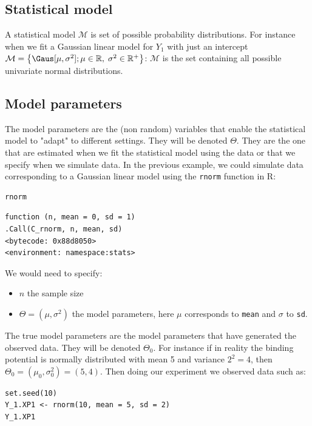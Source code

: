 \documentclass[12pt]{article}
\newcommand\Real{\mathbb{R}}
\newcommand\model{\mathcal{M}}
\begin{document}
\subsection{Statistical model}
\label{sec:org286bccc}
A statistical model \(\model\) is set of possible probability
distributions. For instance when we fit a Gaussian linear model for
\(Y_1\) with just an intercept \(\model=\left\{\Gaus[\mu,\sigma^2];\mu
\in \Real, \; \sigma^2 \in \Real^+ \right\}\): \(\model\) is the set
containing all possible univariate normal distributions.

\subsection{Model parameters}
\label{sec:org93a7194}

The model parameters are the (non random) variables that enable the
statistical model to "adapt" to different settings. They will be
denoted \(\Theta\). They are the one that are estimated when we fit
the statistical model using the data or that we specify when we
simulate data. In the previous example, we could simulate data
corresponding to a Gaussian linear model using the \texttt{rnorm} function in
R:
\lstset{language=r,label= ,caption= ,captionpos=b,numbers=none}
\begin{lstlisting}
rnorm
\end{lstlisting}

\begin{verbatim}
function (n, mean = 0, sd = 1) 
.Call(C_rnorm, n, mean, sd)
<bytecode: 0x88d8050>
<environment: namespace:stats>
\end{verbatim}

We would need to specify:
\begin{itemize}
\item \(n\) the sample size
\item \(\Theta=(\mu,\sigma^2)\) the model parameters, here \(\mu\) corresponds to \texttt{mean} and \(\sigma\) to \texttt{sd}.
\end{itemize}

\bigskip

The true model parameters are the model parameters that have generated
the observed data. They will be denoted \(\Theta_0\). For instance if
in reality the binding potential is normally distributed with mean 5
and variance \(2^2=4\), then
\(\Theta_0=(\mu_0,\sigma_0^2)=(5,4)\). Then doing our experiment we
observed data such as:
\lstset{language=r,label= ,caption= ,captionpos=b,numbers=none}
\begin{lstlisting}
set.seed(10)
Y_1.XP1 <- rnorm(10, mean = 5, sd = 2)
Y_1.XP1
\end{lstlisting}
\end{document}
